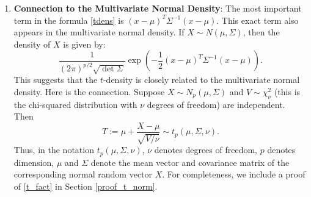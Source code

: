 \documentclass{scrartcl}
\begin{document}
\begin{enumerate}
\item \textbf{Connection to the Multivariate Normal Density}: 
The
most important term in the formula \eqref{tdens}  is $(x -
\mu)^T\Sigma^{-1}(x - \mu)$. This exact term also appears in the
multivariate normal density. If $X \sim N(\mu, \Sigma)$, then the
density of $X$ is given by:
\begin{equation*}
  \frac{1}{(2\pi)^{p/2}\sqrt{\det \Sigma}} \exp \left(-\frac{1}{2} (x
    - \mu)^T \Sigma^{-1} (x - \mu) 
  \right). 
\end{equation*}
This suggests that the $t$-density is closely related to the
multivariate normal density. Here is the connection. Suppose $X \sim
N_p(\mu, \Sigma)$ and $V \sim \chi^2_{\nu}$ (this is the chi-squared
distribution with $\nu$ degrees of freedom) are independent. Then 
\begin{equation}\label{t_fact}
  T := \mu + \frac{X - \mu}{\sqrt{V/\nu}} \sim t_p(\mu, \Sigma, \nu). 
\end{equation}
Thus, in the notation $t_{p}(\mu, \Sigma, \nu)$, $\nu$ denotes
degrees of freedom, $p$ denotes dimension, $\mu$ and $\Sigma$ denote
the mean vector and covariance matrix of the corresponding normal
random vector $X$. For completeness, we include a proof of
\eqref{t_fact} in Section \ref{proof_t_norm}.


\end{enumerate}
\end{document}
